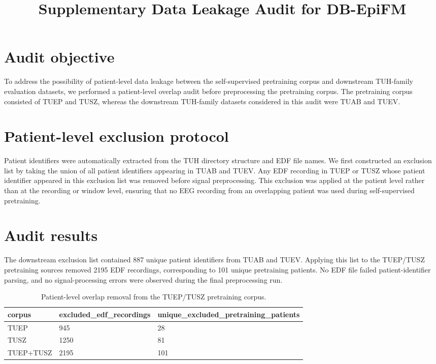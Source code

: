 \documentclass[11pt]{article}
\title{Supplementary Data Leakage Audit for DB-EpiFM}
\date{}
\begin{document}
\maketitle

\section*{Audit objective}
To address the possibility of patient-level data leakage between the self-supervised pretraining corpus and downstream TUH-family evaluation datasets, we performed a patient-level overlap audit before preprocessing the pretraining corpus. The pretraining corpus consisted of TUEP and TUSZ, whereas the downstream TUH-family datasets considered in this audit were TUAB and TUEV.

\section*{Patient-level exclusion protocol}
Patient identifiers were automatically extracted from the TUH directory structure and EDF file names. We first constructed an exclusion list by taking the union of all patient identifiers appearing in TUAB and TUEV. Any EDF recording in TUEP or TUSZ whose patient identifier appeared in this exclusion list was removed before signal preprocessing. This exclusion was applied at the patient level rather than at the recording or window level, ensuring that no EEG recording from an overlapping patient was used during self-supervised pretraining.

\section*{Audit results}
The downstream exclusion list contained 887 unique patient identifiers from TUAB and TUEV. Applying this list to the TUEP/TUSZ pretraining sources removed 2195 EDF recordings, corresponding to 101 unique pretraining patients. No EDF file failed patient-identifier parsing, and no signal-processing errors were observed during the final preprocessing run.

\begin{table}[htbp]
\centering
\caption{Patient-level overlap removal from the TUEP/TUSZ pretraining corpus.}
\label{tab:sup_overlap_by_corpus}
\begin{tabular}{lll}
\toprule
corpus & excluded\_edf\_recordings & unique\_excluded\_pretraining\_patients \\
\midrule
TUEP & 945 & 28 \\
TUSZ & 1250 & 81 \\
TUEP+TUSZ & 2195 & 101 \\
\bottomrule
\end{tabular}
\end{table}
\end{document}
